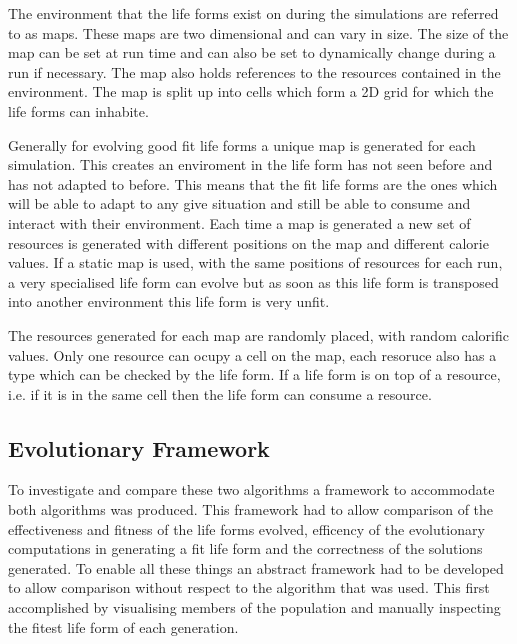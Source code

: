 \documentclass[12pt]{article}
\begin{document}
The environment that the life forms exist on during the simulations are referred to as maps. These maps are two dimensional and can vary in size.
The size of the map can be set at run time and can also be set to dynamically change during a run if necessary. The map also holds references
to the resources contained in the environment. The map is split up into cells which form a 2D grid for which the life forms can inhabite. 

Generally for evolving good fit life forms a unique map is generated for each simulation. This creates an enviroment in the life form has not
seen before and has not adapted to before. This means that the fit life forms are the ones which will be able to adapt to any give situation
and still be able to consume and interact with their environment. Each time a map is generated a new set of resources is generated with different
positions on the map and different calorie values. If a static map is used, with the same positions of resources for each run, a very specialised 
life form can evolve but as soon as this life form is transposed into another environment this life form is very unfit.

The resources generated for each map are randomly placed, with random calorific values. Only one resource can ocupy a cell on the map, each resoruce also has
a type which can be checked by the life form. If a life form is on top of a resource, i.e. if it is in the same cell then the life form can consume a resource. 
 

\subsection{Evolutionary Framework}
To investigate and compare these two algorithms %
a framework to accommodate both algorithms was produced. This framework had to allow comparison of the effectiveness and fitness of the life forms evolved, efficency of the 
evolutionary computations in generating a fit life form and the correctness of the solutions generated. To enable all these things an abstract framework had 
to be developed to allow comparison without respect to the algorithm that was used. This first accomplished by visualising members of the population and 
manually inspecting the fitest life form of each generation. 
\end{document}

